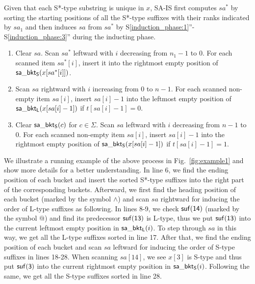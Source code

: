 \documentclass[10pt,journal,compsoc]{IEEEtran}
\begin{document}
Given that each S*-type substring is unique in $x$, SA-IS first computes $sa^*$ by sorting the starting positions of all the S*-type suffixes with their ranks indicated by $sa_1$ and then induces $sa$ from $sa^*$ by S\ref{induction_phase:1}''-S\ref{induction_phase:3}'' during the inducting phase.

\begin{enumerate}[S1'']
	
	\item Clear $sa$. Scan $sa^*$ leftward with $i$ decreasing from $n_1 - 1$ to $0$. For each scanned item $sa^*[i]$, insert it into the rightmost empty position of ${\sf sa\_bkt_S}(x[sa^*[i]])$. \label{induction_phase:1}
	
	\item Scan $sa$ rightward with $i$ increasing from $0$ to $n - 1$. For each scanned non-empty item $sa[i]$, insert $sa[i] - 1$ into the leftmost empty position of ${\sf sa\_bkt_L}(x[sa[i] - 1])$ if $t[sa[i] - 1] = 0$.\label{induction_phase:2}
	
	\item Clear ${\sf sa\_bkt_S}(c)$ for $c \in \Sigma$. Scan $sa$ leftward with $i$ decreasing from $n - 1$ to $0$. For each scanned non-empty item $sa[i]$, insert $sa[i] - 1$ into the rightmost empty position of ${\sf sa\_bkt_S}(x[sa[i] - 1])$ if $t[sa[i] - 1] = 1$.\label{induction_phase:3}
	
\end{enumerate}

We illustrate a running example of the above process in Fig.~\ref{fig:example1} and show more details for a better understanding. In line 6, we find the ending position of each bucket and insert the sorted S*-type suffixes into the right part of the corresponding buckets. Afterward, we first find the heading position of each bucket (marked by the symbol $\wedge$) and scan $sa$ rightward for inducing the order of L-type suffixes as following. In lines 8-9, we check $\sf suf(14)$ (marked by the symbol $@$) and find its predecessor ${\sf suf(13)}$ is L-type, thus we put ${\sf suf(13)}$ into the current leftmost empty position in ${\sf sa\_bkt_L}(i)$. To step through $sa$ in this way, we get all the L-type suffixes sorted in line 17. After that, we find the ending position of each bucket and scan $sa$ leftward for inducing the order of S-type suffixes in lines 18-28. When scanning $sa[14]$, we see $x[3]$ is S-type and thus put ${\sf suf(3)}$ into the current rightmost empty position in ${\sf sa\_bkt_S}(i)$. Following the same, we get all the S-type suffixes sorted in line 28.
\end{document}
